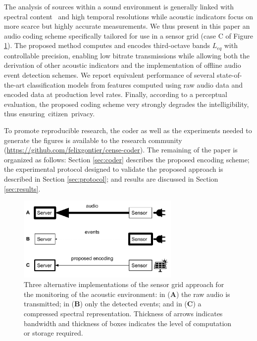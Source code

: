 \documentclass[sensors,article,accept,moreauthors,pdftex,10pt,a4paper]{mdpi}
\begin{document}
The analysis of sources within a sound environment is generally linked with spectral content~\cite{ishiyama2000} and high temporal resolutions while acoustic indicators focus on more scarce but highly accurate measurements. We thus present in this paper an audio coding scheme specifically tailored for use in a sensor grid (case C of Figure \ref{fig:codingScheme}). The proposed method computes and encodes third-octave bands $L_{eq}$ with controllable precision, enabling low bitrate transmissions while allowing both the derivation of other acoustic indicators and the implementation of offline audio event detection schemes. We report equivalent performance of several state-of-the-art classification models from features computed using raw audio data and encoded data at production level rates. Finally, according to a perceptual evaluation, the proposed coding scheme very strongly degrades the intelligibility, thus ensuring\mbox{ citizen privacy.}

{To} promote reproducible research, the coder as well as the experiments needed to generate the figures is available to the research {community} ({\url{https://github.com/felixgontier/cense-coder}}). The remaining of the paper is organized as follows: Section \ref{sec:coder} describes the proposed encoding {scheme;} the experimental protocol designed to validate the proposed approach is described in {Section \ref{sec:protocol};} and results are discussed in Section \ref{sec:results}.

\begin{figure}[H]
\centering
\includegraphics[width=0.7\textwidth]{figures/censeCoder}
\caption{Three alternative implementations of the sensor grid approach for the monitoring of the acoustic {environment:} in (\textbf{A}) the raw audio is transmitted; in (\textbf{B}) only the detected events; and in (\textbf{C}) a compressed spectral representation. Thickness of arrows indicates bandwidth and thickness of boxes indicates the level of computation or storage required.}
\label{fig:codingScheme}
\end{figure}
\end{document}
